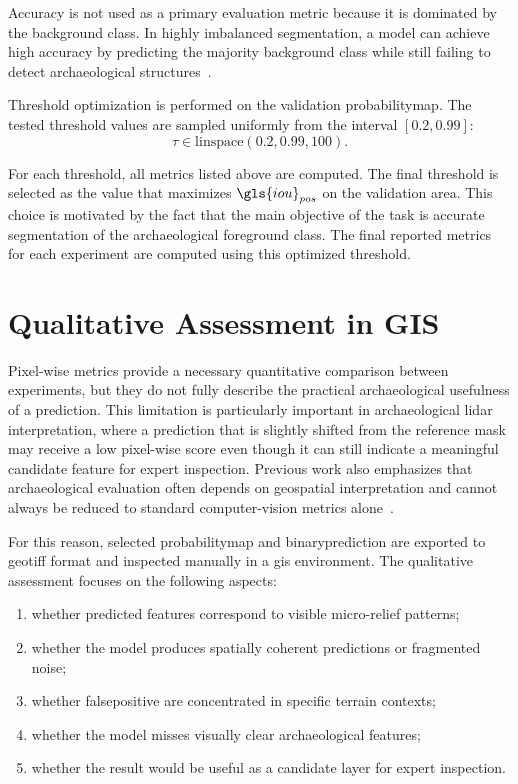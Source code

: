 Accuracy is not used as a primary evaluation metric because it is dominated by the background class. In highly imbalanced segmentation, a model can achieve high accuracy by predicting the majority background class while still failing to detect archaeological structures~\cite{wurm_semantic_2019,griffiths_improving_2019}.

Threshold optimization is performed on the validation \gls{probabilitymap}. The tested threshold values are sampled uniformly from the interval $[0.2, 0.99]$:
\begin{equation}
    \tau \in \mathrm{linspace}(0.2, 0.99, 100).
\end{equation}

For each threshold, all metrics listed above are computed. The final threshold is selected as the value that maximizes $\gls{iou}_{pos}$ on the validation area. This choice is motivated by the fact that the main objective of the task is accurate segmentation of the archaeological foreground class. The final reported metrics for each experiment are computed using this optimized threshold.

\section{Qualitative Assessment in GIS}

Pixel-wise metrics provide a necessary quantitative comparison between experiments, but they do not fully describe the practical archaeological usefulness of a prediction. This limitation is particularly important in archaeological \gls{lidar} interpretation, where a prediction that is slightly shifted from the reference mask may receive a low pixel-wise score even though it can still indicate a meaningful candidate feature for expert inspection. Previous work also emphasizes that archaeological evaluation often depends on geospatial interpretation and cannot always be reduced to standard computer-vision metrics alone~\cite{fiorucci_deep_2022}.

For this reason, selected \gls{probabilitymap} and \gls{binaryprediction} are exported to \gls{geotiff} format and inspected manually in a \gls{gis} environment. The qualitative assessment focuses on the following aspects:
\begin{enumerate}
    \item whether predicted features correspond to visible micro-relief patterns;
    \item whether the model produces spatially coherent predictions or fragmented noise;
    \item whether \gls{falsepositive} are concentrated in specific terrain contexts;
    \item whether the model misses visually clear archaeological features;
    \item whether the result would be useful as a candidate layer for expert inspection.
\end{enumerate}

